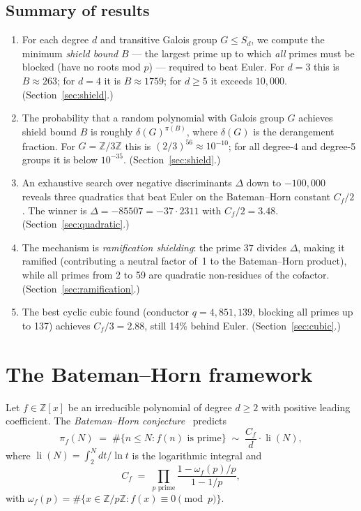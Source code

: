 \documentclass[11pt,a4paper]{article}
\theoremstyle{definition}
\theoremstyle{remark}
\newcommand{\Z}{\mathbb{Z}}
\newcommand{\li}{\operatorname{li}}
\begin{document}
\subsection{Summary of results}

\begin{enumerate}[label=(\roman*)]
\item For each degree $d$ and transitive Galois group $G \leq S_d$, we compute the minimum \emph{shield bound} $B$ --- the largest prime up to which \emph{all} primes must be blocked (have no roots mod $p$) --- required to beat Euler. For $d=3$ this is $B \approx 263$; for $d=4$ it is $B \approx 1759$; for $d \geq 5$ it exceeds $10{,}000$. (Section~\ref{sec:shield}.)

\item The probability that a random polynomial with Galois group $G$ achieves shield bound $B$ is roughly $\delta(G)^{\pi(B)}$, where $\delta(G)$ is the derangement fraction. For $G = \Z/3\Z$ this is $(2/3)^{56} \approx 10^{-10}$; for all degree-4 and degree-5 groups it is below $10^{-35}$. (Section~\ref{sec:shield}.)

\item An exhaustive search over negative discriminants $\Delta$ down to $-100{,}000$ reveals three quadratics that beat Euler on the Bateman--Horn constant $C_f/2$. The winner is $\Delta = -85507 = -37 \cdot 2311$ with $C_f/2 = 3.48$. (Section~\ref{sec:quadratic}.)

\item The mechanism is \emph{ramification shielding}: the prime $37$ divides $\Delta$, making it ramified (contributing a neutral factor of~1 to the Bateman--Horn product), while all primes from 2 to 59 are quadratic non-residues of the cofactor. (Section~\ref{sec:ramification}.)

\item The best cyclic cubic found (conductor $q = 4{,}851{,}139$, blocking all primes up to 137) achieves $C_f/3 = 2.88$, still 14\% behind Euler. (Section~\ref{sec:cubic}.)
\end{enumerate}


\section{The Bateman--Horn framework}\label{sec:bh}

Let $f \in \Z[x]$ be an irreducible polynomial of degree $d \geq 2$ with positive leading coefficient.
The \emph{Bateman--Horn conjecture}~\cite{BH} predicts
\[
\pi_f(N) \;=\; \#\{n \leq N : f(n) \text{ is prime}\} \;\sim\; \frac{C_f}{d} \cdot \li(N),
\]
where $\li(N) = \int_2^N dt/\ln t$ is the logarithmic integral and
\begin{equation}\label{eq:BH}
C_f \;=\; \prod_{p \text{ prime}} \frac{1 - \omega_f(p)/p}{1 - 1/p},
\end{equation}
with $\omega_f(p) = \#\{x \in \Z/p\Z : f(x) \equiv 0 \pmod{p}\}$.
\end{document}

